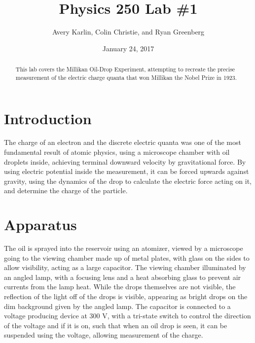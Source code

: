 \documentclass[11pt]{article}
\title{Physics 250 Lab \#1}
\author{Avery Karlin, Colin Christie, and Ryan Greenberg}
\date{January 24, 2017}
\begin{document}
\maketitle
\begin{abstract} This lab covers the Millikan Oil-Drop Experiment, attempting to recreate the precise measurement of the electric charge quanta that won Millikan the Nobel Prize in 1923.
\end{abstract}

\section{Introduction}
The charge of an electron and the discrete electric quanta was one of the most fundamental result of atomic physics, using a microscope chamber with oil droplets inside, achieving terminal downward velocity by gravitational force. By using electric potential inside the measurement, it can be forced upwards against gravity, using the dynamics of the drop to calculate the electric force acting on it, and determine the charge of the particle.

\section{Apparatus}
The oil is sprayed into the reservoir using an atomizer, viewed by a microscope going to the viewing chamber made up of metal plates, with glass on the sides to allow visibility, acting as a large capacitor. The viewing chamber illuminated by an angled lamp, with a focusing lens and a heat absorbing glass to prevent air currents from the lamp heat. While the drops themselves are not visible, the reflection of the light off of the drops is visible, appearing as bright drops on the dim background given by the angled lamp. The capacitor is connected to a voltage producing device at 300 V, with a tri-state switch to control the direction of the voltage and if it is on, such that when an oil drop is seen, it can be suspended using the voltage, allowing measurement of the charge.
\end{document}
